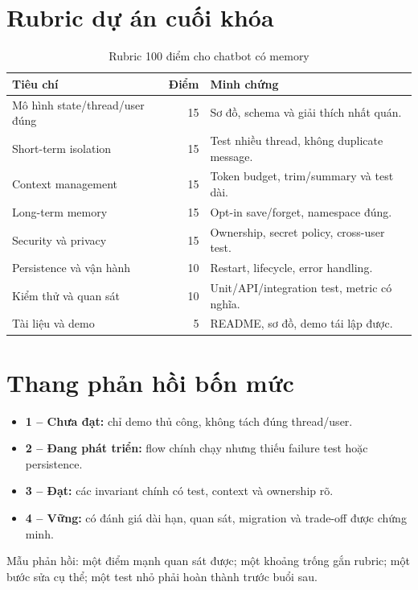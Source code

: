 \section{Rubric dự án cuối khóa}

\begin{table}[H]
\centering
\caption{Rubric 100 điểm cho chatbot có memory}
\begin{tabular}{p{6.1cm}r p{6.4cm}}
\toprule
\textbf{Tiêu chí} & \textbf{Điểm} & \textbf{Minh chứng} \\
\midrule
Mô hình state/thread/user đúng & 15 & Sơ đồ, schema và giải thích nhất quán. \\
Short-term isolation & 15 & Test nhiều thread, không duplicate message. \\
Context management & 15 & Token budget, trim/summary và test dài. \\
Long-term memory & 15 & Opt-in save/forget, namespace đúng. \\
Security và privacy & 15 & Ownership, secret policy, cross-user test. \\
Persistence và vận hành & 10 & Restart, lifecycle, error handling. \\
Kiểm thử và quan sát & 10 & Unit/API/integration test, metric có nghĩa. \\
Tài liệu và demo & 5 & README, sơ đồ, demo tái lập được. \\
\bottomrule
\end{tabular}
\end{table}

\section{Thang phản hồi bốn mức}

\begin{itemize}
  \item \textbf{1 -- Chưa đạt:} chỉ demo thủ công, không tách đúng thread/user.
  \item \textbf{2 -- Đang phát triển:} flow chính chạy nhưng thiếu failure test hoặc persistence.
  \item \textbf{3 -- Đạt:} các invariant chính có test, context và ownership rõ.
  \item \textbf{4 -- Vững:} có đánh giá dài hạn, quan sát, migration và trade-off được chứng minh.
\end{itemize}

Mẫu phản hồi: một điểm mạnh quan sát được; một khoảng trống gắn rubric; một bước sửa cụ thể; một
test nhỏ phải hoàn thành trước buổi sau.

